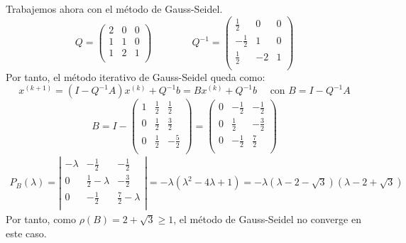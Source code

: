 \begin{ejercicio}
\begin{enumerate}
        Trabajemos ahora con el método de Gauss-Seidel.
        $$Q=\left( \begin{array}{ccc}
            2 & 0 & 0 \\
            1 & 1 & 0 \\
            1 & 2 & 1 \\
        \end{array} \right)
        \qquad \qquad
        Q^{-1}=\left( \begin{array}{ccc}
            \frac{1}{2} & 0 & 0 \\
            - \frac{1}{2} & 1 & 0 \\
             \frac{1}{2} & -2 & 1 \\
        \end{array} \right)
        $$
        Por tanto, el método iterativo de Gauss-Seidel queda como:
        $$x^{(k+1)} = (I-Q^{-1}A)x^{(k)} + Q^{-1}b 
        =Bx^{(k)} + Q^{-1}b
        \quad \text{ con } B=I-Q^{-1}A$$
        $$B=I-\left( \begin{array}{ccc}
            1 & \frac{1}{2} & \frac{1}{2} \\
            0 &  \frac{1}{2} &  \frac{3}{2} \\
            0 &  \frac{1}{2} &  -\frac{5}{2} \\
        \end{array} \right)
        = \left( \begin{array}{ccc}
            0 & -\frac{1}{2} & -\frac{1}{2} \\
            0 &  \frac{1}{2} &  -\frac{3}{2} \\
            0 &  -\frac{1}{2} &  \frac{7}{2} \\
        \end{array} \right)$$
        \begin{multline*}
            P_B(\lambda)=
            \left|\begin{array}{ccc}
               -\lambda & -\frac{1}{2} & -\frac{1}{2} \\
                0 &  \frac{1}{2}-\lambda &  -\frac{3}{2} \\
                0 &  -\frac{1}{2} &  \frac{7}{2}-\lambda \\
            \end{array} \right|
            = -\lambda\left(\lambda^2 - 4\lambda + 1\right)
            = -\lambda(\lambda-2-\sqrt{3})(\lambda-2+\sqrt{3})
        \end{multline*}
        Por tanto, como $\rho(B)= 2+\sqrt{3}\geq 1$, el método de Gauss-Seidel no converge en este caso.        
    \end{enumerate}
\end{ejercicio}

